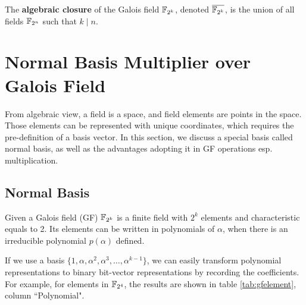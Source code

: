 \begin{Definition}
The {\bf algebraic closure} of the Galois field ${\mathbb{F}}_{2^k}$, denoted $\overline{{\mathbb{F}}_{2^k}}$, is the 
union of all fields ${\mathbb{F}}_{2^n}$ such that $k \mid n$.
\end{Definition}

\section{Normal Basis Multiplier over Galois Field}
From algebraic view, a field is a space, and field elements are points in the space. Those elements can be 
represented with unique coordinates, which requires the pre-definition of a basis vector. In this
section, we discuss a special basis called normal basis, as well as the advantages adopting it in 
GF operations esp. multiplication.
\subsection{Normal Basis}
Given a Galois field (GF) ${\mathbb{F}}_{2^k}$ is a finite field with  $2^k$ elements and characteristic equals to 2.
Its elements can be written in polynomials of $\alpha$, when there is an irreducible polynomial $p(\alpha)$
defined.

If we use a basis $\{1,\alpha,\alpha^2,\alpha^3,\dots,\alpha^{k-1}\}$, we can easily transform polynomial representations
to binary bit-vector representations by recording the coefficients. For example, for elements in
${\mathbb{F}}_{2^4}$, the results are shown in table \ref{tab:gfelement}, column ``Polynomial".


